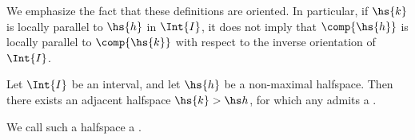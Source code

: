 We emphasize the fact that these definitions are oriented. In particular, if $\hs{k}$ is locally parallel to $\hs{h}$ in $\Int{I}$, it does not imply that $\comp{\hs{h}}$ is locally parallel to $\comp{\hs{k}}$ with respect to the inverse orientation of $\Int{I}$.



\begin{lemma}\label{lemma0}
Let $\Int{I}$ be an interval, and let $\hs{h}$ be a non-maximal halfspace. Then there exists an adjacent halfspace $\hs{k}>\hs h$, for which any \intc admits a \countc.

\end{lemma}

We call such a halfspace a \emph{\countcer}.

